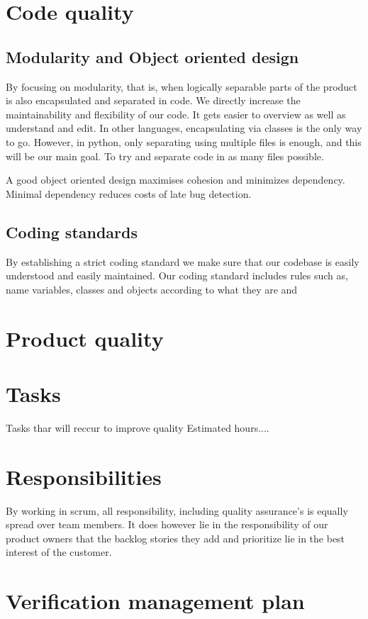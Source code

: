 \documentclass{article}
\begin{document}
\section{Code quality}

\subsection{Modularity and Object oriented design}
By focusing on modularity, that is, when logically separable parts of the product is also encapsulated and separated in code.
We directly increase the maintainability and flexibility of our code.
It gets easier to overview as well as understand and edit. In other languages, encapsulating via classes is the only way to go. However, in python, only separating using multiple files is enough, and this will be our main goal. To try and separate code in as many files possible.

A good object oriented design maximises cohesion and minimizes dependency. Minimal dependency reduces costs of late bug detection.

\subsection{Coding standards}
By establishing a strict coding standard we make sure that our codebase is easily understood and easily maintained.
Our coding standard includes rules such as, name variables, classes and objects according to what they are and 


\section{Product quality}

\section{Tasks}
Tasks thar will reccur to improve quality
Estimated hours....
\section{Responsibilities}
By working in scrum, all responsibility, including quality assurance's is equally spread over team members.
It does however lie in the responsibility of our product owners that the backlog stories they add and prioritize lie in the best interest of the customer.
\section{Verification management plan}
\end{document}
